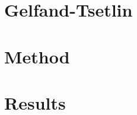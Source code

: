 \documentclass[12pt, a4paper, twoside]{article}
\theoremstyle{definition}
\theoremstyle{example}
\theoremstyle{plain}
\theoremstyle{remark}
\numberwithin{equation}{section}
\numberwithin{figure}{section}
\begin{document}
\section{Gelfand-Tsetlin} \label{gt}
	
\clearpage

\section{Method} \label{method}
	
\clearpage

\section{Results} \label{results}
	
\clearpage






 
\end{document}
